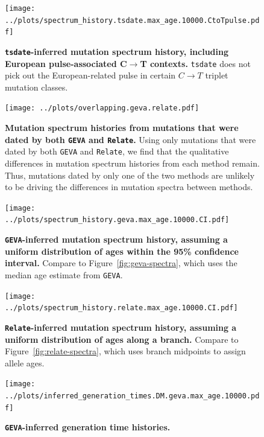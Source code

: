 \documentclass[]{article}
\newcommand{\GEVA}{\texttt{GEVA}\xspace}
\newcommand{\tsdate}{\texttt{tsdate}\xspace}
\newcommand{\relate}{\texttt{Relate}\xspace}
\begin{document}
\begin{figure}[ht!]
    \centering
    \texttt{[image: ../plots/spectrum\_history.tsdate.max\_age.10000.CtoTpulse.pdf]}
    \caption{
        \textbf{\tsdate-inferred mutation spectrum history, including European
            pulse-associated C$\rightarrow$T contexts.}
        \tsdate does not pick out the European-related pulse in certain $C\rightarrow T$
        triplet mutation classes.
    }
    \label{fig:tsdate-spectra-singletons}
\end{figure}


\begin{figure}[ht!]
    \centering
    \texttt{[image: ../plots/overlapping.geva.relate.pdf]}
    \caption{
        \textbf{Mutation spectrum histories from mutations that were dated by
        both \GEVA and \relate.}
        Using only mutations that were dated by both \GEVA and \relate, we find
        that the qualitative differences in mutation spectrum histories from
        each method remain. Thus, mutations dated by only one of the two methods
        are unlikely to be driving the differences in mutation spectra between
        methods.
    }
    \label{fig:overlap-spectra}
\end{figure}


\begin{figure}[ht!]
    \centering
    \texttt{[image: ../plots/spectrum\_history.geva.max\_age.10000.CI.pdf]}
    \caption{
        \textbf{\GEVA-inferred mutation spectrum history, assuming a uniform
        distribution of ages within the 95\% confidence interval.} Compare to
        Figure~\ref{fig:geva-spectra}, which uses the median age estimate
        from \GEVA.
    }
    \label{fig:geva-CI}
\end{figure}


\begin{figure}[ht!]
    \centering
    \texttt{[image: ../plots/spectrum\_history.relate.max\_age.10000.CI.pdf]}
    \caption{
        \textbf{\relate-inferred mutation spectrum history, assuming a uniform
        distribution of ages along a branch.}
        Compare to Figure~\ref{fig:relate-spectra},
        which uses branch midpoints to assign allele ages.
    }
    \label{fig:relate-CI}
\end{figure}



\begin{figure}[ht!]
    \centering
    \texttt{[image: ../plots/inferred\_generation\_times.DM.geva.max\_age.10000.pdf]}
    \caption{
        \textbf{\GEVA-inferred generation time histories.}
    }
    \label{fig:geva-gen-times}
\end{figure}
\end{document}
